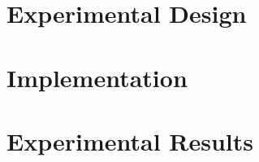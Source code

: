 \documentclass[mathserif]{beamer}
\begin{document}
	\section{Experimental Design}


	\section{Implementation}
	

	\section{Experimental Results}
	

	
\end{document}
